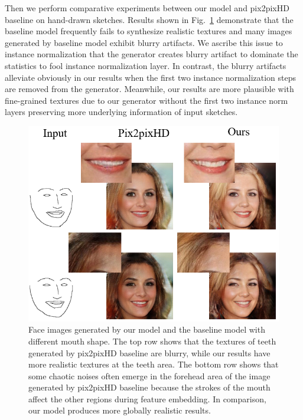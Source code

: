 \documentclass{article}
\begin{document}
Then we perform comparative experiments between our model and pix2pixHD baseline on hand-drawn sketches.
Results shown in Fig.~\ref{fig:compare_1} demonstrate that the baseline model frequently fails to synthesize realistic textures and many images generated by baseline model exhibit blurry artifacts.
We ascribe this issue to instance normalization that the generator creates blurry artifact to dominate the statistics to fool instance normalization layer. 
In contrast, the blurry artifacts alleviate obviously in our results when the first two instance normalization steps are removed from the generator.
Meanwhile, our results are more plausible with fine-grained textures due to our generator without the first two instance norm layers preserving more underlying information of input sketches.
\begin{figure}[htb]
	\centering
	\includegraphics[width=0.45 \textwidth]{texture.png}
	\caption{Face images generated by our model and the baseline model with different mouth shape. The top row shows that the textures of teeth generated by pix2pixHD baseline are blurry, while our results have more realistic textures at the teeth area. The bottom row shows that some chaotic noises often emerge in the forehead area of the image generated by pix2pixHD baseline because the strokes of the mouth affect the other regions during feature embedding. In comparison, our model produces more globally realistic results.}
	\label{fig:compare_1}
\end{figure}
\end{document}
